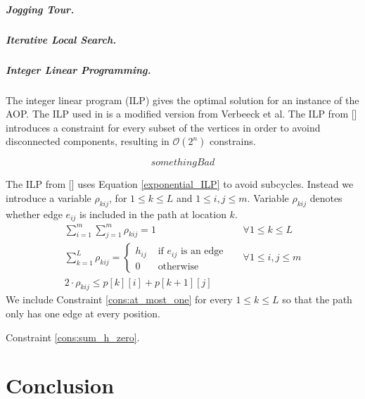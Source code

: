 \documentclass[sigconf,natbib=false]{acmart}
\begin{document}
\subparagraph*{\textbf{Jogging Tour.}}

\subparagraph*{\textbf{Iterative Local Search.}}

\subparagraph*{\textbf{Integer Linear Programming.}}
The integer linear program (ILP) gives the optimal solution for an instance of the AOP. The ILP used in \tG is a modified version from Verbeeck et al. 
The ILP from [] introduces a constraint for every subset of the vertices in order to avoind disconnected components, resulting in $\mathcal{O}(2^n)$ constrains.

\begin{equation}
  something Bad
  \label{exponential_ILP}
\end{equation}

The ILP from [] uses Equation \ref{exponential_ILP} to avoid subcycles. Instead we introduce a variable $\rho_{kij}$, for $1 \leq k \leq L$ and $1 \leq i, j \leq m$. Variable $\rho_{kij}$ denotes whether edge $e_{ij}$ is included in the path at location $k$.
\begin{align}
  \sum_{i=1}^m \sum_{j=1}^m \rho_{kij} = 1 &&\forall 1 \leq k \leq L \label{cons:at_most_one}\\
  \sum_{k=1}^L \rho_{kij} = \begin{cases} h_{ij} &\text{ if } e_{ij} \text{ is an edge} \\
    0 &\text{ otherwise}
  \end{cases} && \forall 1 \leq i, j \leq m \label{cons:sum_h_zero}\\
  2 \cdot \rho_{kij} \leq p[k][i] + p[k+1][j]
\end{align}
We include Constraint \ref{cons:at_most_one} for every $1 \leq k \leq L$ so that the path only has one edge at every position.

Constraint \ref{cons:sum_h_zero}.

\section{Conclusion}

\end{document}
